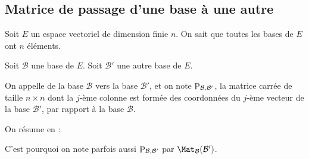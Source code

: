 \documentclass[class=report,crop=false]{standalone}
\begin{document}
\subsection{Matrice de passage d'une base à une autre}


Soit $E$ un espace vectoriel de dimension finie $n$.
On sait que toutes les bases de $E$ ont $n$ éléments.


\begin{definition}
Soit $\mathcal{B}$ une base de $E$. Soit $\mathcal{B}'$ une autre base de $E$.

On appelle  de la base $\mathcal{B}$ vers la base
$\mathcal{B}'$, et on note
$\mathop{\mathrm{P}}\nolimits_{\mathcal{B},\mathcal{B'}}$, la matrice carrée de taille $n \times n$ dont la $j$-ème colonne
est formée des coordonnées du $j$-ème vecteur de la base $\mathcal{B}'$,
par rapport à la base $\mathcal{B}$.
\end{definition}
On résume en :

C'est pourquoi on note parfois aussi $\mathop{\mathrm{P}}\nolimits_{\mathcal{B},\mathcal{B'}}$
par $\Mat_{\mathcal{B}}(\mathcal{B}')$.
\end{document}
